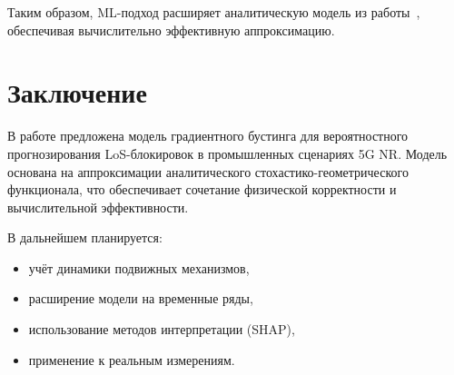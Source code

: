 \documentclass[%
]{ittmm}
\begin{document}
Таким образом, ML-подход расширяет аналитическую модель из работы~\cite{1}, обеспечивая вычислительно эффективную аппроксимацию.

\section{Заключение}

В работе предложена модель градиентного бустинга для вероятностного прогнозирования LoS-блокировок в промышленных сценариях 5G NR. 
Модель основана на аппроксимации аналитического стохастико-геометрического функционала, что обеспечивает сочетание физической корректности и вычислительной эффективности.

В дальнейшем планируется:

\begin{itemize}
  \item учёт динамики подвижных механизмов,  
  \item расширение модели на временные ряды,  
  \item использование методов интерпретации (SHAP),  
  \item применение к реальным измерениям.  
\end{itemize}

\nocite{*}
\printbibliography

\appendix
\end{document}

